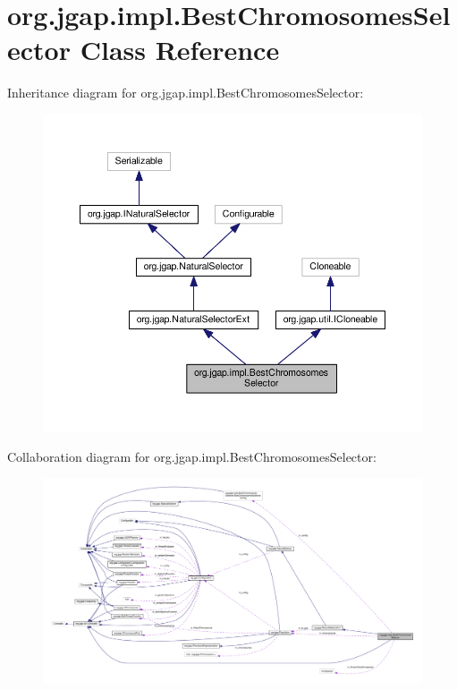 \hypertarget{classorg_1_1jgap_1_1impl_1_1_best_chromosomes_selector}{\section{org.\-jgap.\-impl.\-Best\-Chromosomes\-Selector Class Reference}
\label{classorg_1_1jgap_1_1impl_1_1_best_chromosomes_selector}
}


Inheritance diagram for org.\-jgap.\-impl.\-Best\-Chromosomes\-Selector\-:
\nopagebreak
\begin{figure}[H]
\begin{center}
\leavevmode
\includegraphics[width=350pt]{classorg_1_1jgap_1_1impl_1_1_best_chromosomes_selector__inherit__graph}
\end{center}
\end{figure}


Collaboration diagram for org.\-jgap.\-impl.\-Best\-Chromosomes\-Selector\-:
\nopagebreak
\begin{figure}[H]
\begin{center}
\leavevmode
\includegraphics[width=350pt]{classorg_1_1jgap_1_1impl_1_1_best_chromosomes_selector__coll__graph}
\end{center}
\end{figure}
